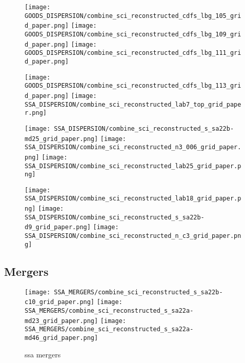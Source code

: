\documentclass[fleqn,usenatbib]{mn2e}
\begin{document}
\begin{figure*}
\centering
\texttt{[image: GOODS\_DISPERSION/combine\_sci\_reconstructed\_cdfs\_lbg\_105\_grid\_paper.png]}
\texttt{[image: GOODS\_DISPERSION/combine\_sci\_reconstructed\_cdfs\_lbg\_109\_grid\_paper.png]}
\texttt{[image: GOODS\_DISPERSION/combine\_sci\_reconstructed\_cdfs\_lbg\_111\_grid\_paper.png]}
\label{fig:goods_disp_3}
\end{figure*}

\begin{figure*}
\centering
\texttt{[image: GOODS\_DISPERSION/combine\_sci\_reconstructed\_cdfs\_lbg\_113\_grid\_paper.png]}
\texttt{[image: SSA\_DISPERSION/combine\_sci\_reconstructed\_lab7\_top\_grid\_paper.png]}
\label{fig:goods_disp_4}
\end{figure*}


\begin{figure*}
\centering
\texttt{[image: SSA\_DISPERSION/combine\_sci\_reconstructed\_s\_sa22b-md25\_grid\_paper.png]}
\texttt{[image: SSA\_DISPERSION/combine\_sci\_reconstructed\_n3\_006\_grid\_paper.png]}
\texttt{[image: SSA\_DISPERSION/combine\_sci\_reconstructed\_lab25\_grid\_paper.png]}
\label{fig:SSA_disp_2}
\end{figure*}


\begin{figure*}
\centering
\texttt{[image: SSA\_DISPERSION/combine\_sci\_reconstructed\_lab18\_grid\_paper.png]}
\texttt{[image: SSA\_DISPERSION/combine\_sci\_reconstructed\_s\_sa22b-d9\_grid\_paper.png]}
\texttt{[image: SSA\_DISPERSION/combine\_sci\_reconstructed\_n\_c3\_grid\_paper.png]}
\label{fig:SSA_disp_1}
\end{figure*}

\subsection{Mergers}\label{app:mergers}

\begin{figure*}
\centering
\texttt{[image: SSA\_MERGERS/combine\_sci\_reconstructed\_s\_sa22b-c10\_grid\_paper.png]}
\texttt{[image: SSA\_MERGERS/combine\_sci\_reconstructed\_s\_sa22a-md23\_grid\_paper.png]}
\texttt{[image: SSA\_MERGERS/combine\_sci\_reconstructed\_s\_sa22a-md46\_grid\_paper.png]}
\caption{ssa mergers}
\label{app:ssa_mergers_1}
\end{figure*}
\end{document}
